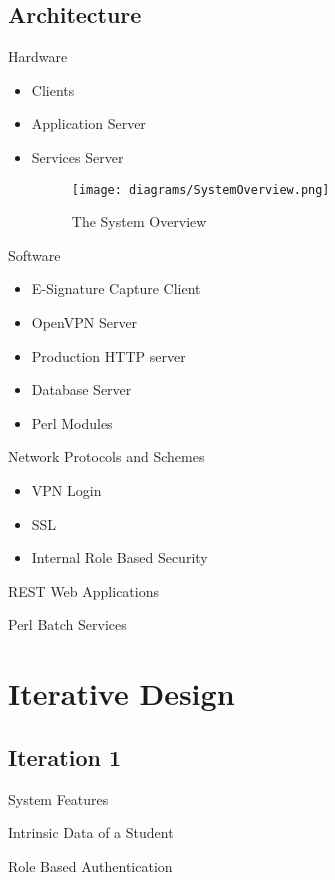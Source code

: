 \documentclass{beamer}
\begin{document}
\subsection{Architecture}
\begin{frame}{Hardware}
\begin{itemize}
\item Clients
\item Application Server
\item Services Server
\begin{figure}[!h]
\texttt{[image: diagrams/SystemOverview.png]} \caption{ The System Overview } \label{fig:Users}
\end{figure}

\end{itemize}
\end{frame}
\begin{frame}{Software}
\begin{itemize}
\item E-Signature Capture Client
\item OpenVPN Server
\item Production HTTP server
\item Database Server
\item Perl Modules 
\end{itemize}
\end{frame}
\begin{frame}{Network Protocols and Schemes}
\begin{itemize}
\item VPN Login
\item SSL 
\item Internal Role Based Security
\end{itemize}
\end{frame}
\begin{frame}{REST Web Applications}
\end{frame}
\begin{frame}{Perl Batch Services}
\end{frame}
\section{Iterative Design}

\subsection{Iteration 1}
\begin{frame}{System Features}
\end{frame}
\begin{frame}{Intrinsic Data of a Student}
\end{frame}
\begin{frame}{Role Based Authentication}
\end{frame}
\end{document}
